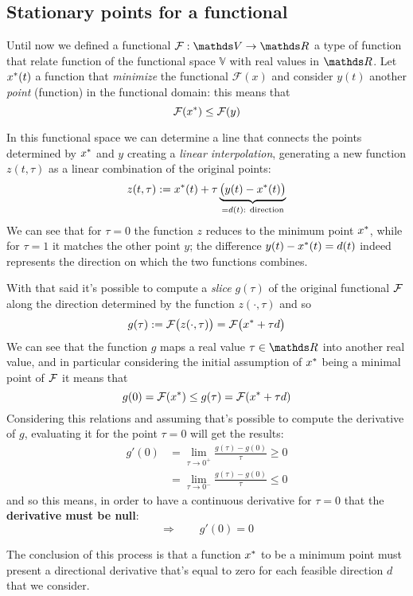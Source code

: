 \subsection{Stationary points for a functional}
	Until now we defined a functional $\mathcal F: \mathds V \rightarrow \R$ a type of function that relate function of the functional space $\mathds V$ with real values in $\R$. Let $x^*(t)$ a function that \textit{minimize} the functional $\mathcal F(x)$ and consider $y(t)$ another \textit{point} (function) in the functional domain: this means that
	\[ \mathcal F(x^*) \leq \mathcal F(y) \]
	
	In this functional space we can determine a line that connects the points determined by $x^*$ and $y$ creating a \textit{linear interpolation}, generating a new function $z(t,\tau)$ as a linear combination of the original points:
	\[ z(t,\tau) :=  x^*(t) + \tau \underbrace{\big( y(t) - x^*(t) \big)}_{=d(t) \textrm{: direction}} \]
	We can see that for $\tau = 0$ the function $z$ reduces to the minimum point $x^*$, while for $\tau = 1$ it matches the other point $y$; the difference $y(t)-x^*(t) = d(t)$ indeed represents the direction on which the two functions combines.
	
	With that said it's possible to compute a \textit{slice} $g(\tau)$ of the original functional $\mathcal F$ along the direction determined by the function $z(\cdot,\tau)$ and so
	\begin{equation}
		g(\tau) := \mathcal F\big( z(\cdot,\tau) \big) = \mathcal F\big(x^* + \tau d\big)
	\end{equation}
	We can see that the function $g$ maps a real value $\tau\in\R$ into another real value, and in particular considering the initial assumption of $x^*$ being a minimal point of $\mathcal F$ it means that
	\[ g(0) = \mathcal F(x^*) \leq g(\tau) = \mathcal F(x^* + \tau d) \]
	Considering this relations and assuming that's possible to compute the derivative of $g$, evaluating it for the point $\tau = 0$ will get the results:
	\begin{align*}
		g'(0) & = \lim_{\tau\rightarrow 0^+} \frac{g(\tau)-g(0)}{\tau} \geq 0 \\
		& = \lim_{\tau\rightarrow 0^-} \frac{g(\tau)-g(0)}{\tau} \leq 0 
	\end{align*}
	and so this means, in order to have a continuous derivative for $\tau = 0$ that the \textbf{derivative must be null}:
	\[ \Rightarrow \qquad g'(0) = 0 \]
	
	The conclusion of this process is that a function $x^*$ to be a minimum point must present a directional derivative that's equal to zero for each feasible direction $d$ that we consider.
	
